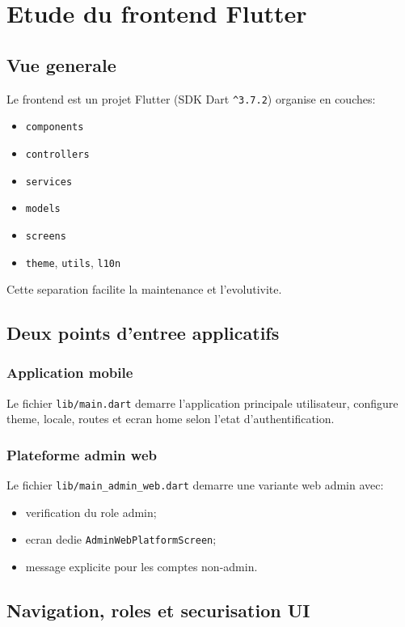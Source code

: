 \chapter{Etude du frontend Flutter}

\section{Vue generale}

Le frontend est un projet Flutter (SDK Dart \texttt{^3.7.2}) organise en couches:
\begin{itemize}
  \item \texttt{components}
  \item \texttt{controllers}
  \item \texttt{services}
  \item \texttt{models}
  \item \texttt{screens}
  \item \texttt{theme}, \texttt{utils}, \texttt{l10n}
\end{itemize}

Cette separation facilite la maintenance et l'evolutivite.

\section{Deux points d'entree applicatifs}

\subsection*{Application mobile}
Le fichier \texttt{lib/main.dart} demarre l'application principale utilisateur, configure theme, locale, routes et ecran home selon l'etat d'authentification.

\subsection*{Plateforme admin web}
Le fichier \texttt{lib/main\_admin\_web.dart} demarre une variante web admin avec:
\begin{itemize}[leftmargin=*]
  \item verification du role admin;
  \item ecran dedie \texttt{AdminWebPlatformScreen};
  \item message explicite pour les comptes non-admin.
\end{itemize}

\section{Navigation, roles et securisation UI}

